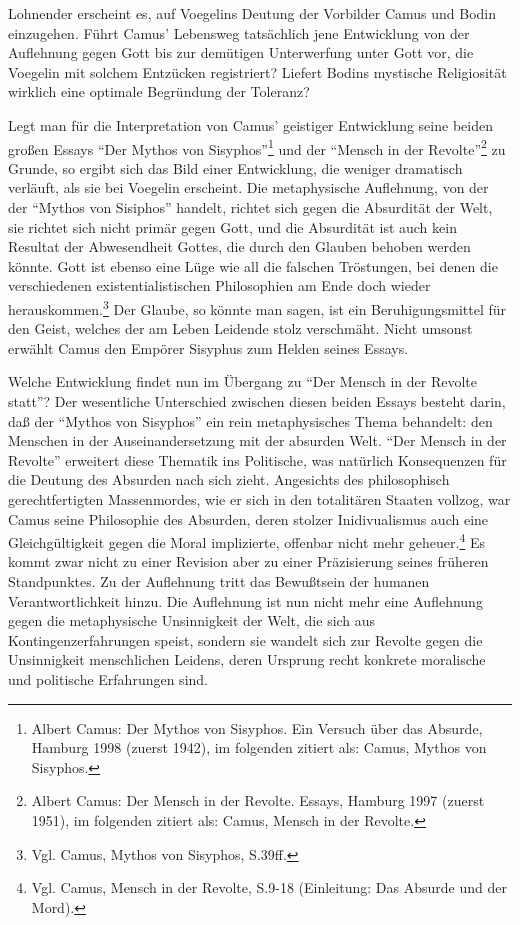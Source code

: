 Lohnender erscheint es, auf Voegelins Deutung der Vorbilder Camus und Bodin
einzugehen. Führt Camus' Lebensweg tatsächlich jene Entwicklung von der
Auflehnung gegen Gott bis zur demütigen Unterwerfung unter Gott vor, die
Voegelin mit solchem Entzücken registriert? Liefert Bodins mystische
Religiosität wirklich eine optimale Begründung der Toleranz?

Legt man für die Interpretation von Camus' geistiger Entwicklung seine beiden
großen Essays "`Der Mythos von Sisyphos"'\footnote{Albert Camus: Der Mythos
  von Sisyphos. Ein Versuch über das Absurde, Hamburg 1998 (zuerst 1942), im
  folgenden zitiert als: Camus, Mythos von Sisyphos.} und der "`Mensch in der
Revolte"'\footnote{Albert Camus: Der Mensch in der Revolte. Essays, Hamburg
  1997 (zuerst 1951), im folgenden zitiert als: Camus, Mensch in der Revolte.}
zu Grunde, so ergibt sich das Bild einer Entwicklung, die weniger dramatisch
verläuft, als sie bei Voegelin erscheint. Die metaphysische Auflehnung, von
der der "`Mythos von Sisiphos"' handelt, richtet sich gegen die Absurdität der
Welt, sie richtet sich nicht primär gegen Gott, und die Absurdität ist auch
kein Resultat der Abwesendheit Gottes, die durch den Glauben behoben werden
könnte. Gott ist ebenso eine Lüge wie all die falschen Tröstungen, bei denen
die verschiedenen existentialistischen Philosophien am Ende doch wieder
herauskommen.\footnote{Vgl. Camus, Mythos von Sisyphos, S.39ff.} Der Glaube,
so könnte man sagen, ist ein Beruhigungsmittel für den Geist, welches der am
Leben Leidende stolz verschmäht. Nicht umsonst erwählt Camus den Empörer
Sisyphus zum Helden seines Essays.

Welche Entwicklung findet nun im Übergang zu "`Der Mensch in der Revolte
statt"'? Der wesentliche Unterschied zwischen diesen beiden Essays
besteht darin, daß der "`Mythos von Sisyphos"' ein rein metaphysisches
Thema behandelt: den Menschen in der Auseinandersetzung mit der absurden
Welt. "`Der Mensch in der Revolte"' erweitert diese Thematik ins
Politische, was natürlich Konsequenzen für die Deutung des Absurden nach
sich zieht. Angesichts des philosophisch gerechtfertigten Massenmordes,
wie er sich in den totalitären Staaten vollzog, war Camus seine
Philosophie des Absurden, deren stolzer Inidivualismus auch eine
Gleichgültigkeit gegen die Moral implizierte, offenbar nicht mehr
geheuer.\footnote{Vgl. Camus, Mensch in der Revolte, S.9-18 (Einleitung:
  Das Absurde und der Mord).} Es kommt zwar nicht zu einer Revision aber
zu einer Präzisierung seines früheren Standpunktes. Zu der Auflehnung
tritt das Bewußtsein der humanen Verantwortlichkeit hinzu. Die
Auflehnung ist nun nicht mehr eine Auflehnung gegen die metaphysische
Unsinnigkeit der Welt, die sich aus Kontingenzerfahrungen speist,
sondern sie wandelt sich zur Revolte gegen die Unsinnigkeit menschlichen
Leidens, deren Ursprung recht konkrete moralische und politische
Erfahrungen sind.

